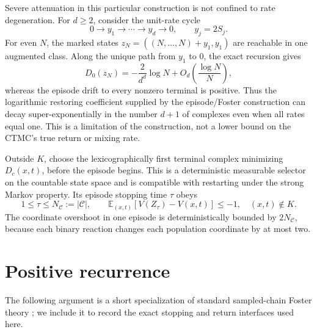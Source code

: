 \begin{remark}
Severe attenuation in this particular construction is not confined to rate
degeneration.  For \(d\ge2\), consider the unit-rate cycle
\[
  0\longrightarrow y_1\longrightarrow\cdots\longrightarrow y_d
  \longrightarrow0,
  \qquad y_j=2S_j.
\]
For even \(N\), the marked states
\(z_N=((N,\ldots,N)+y_1,y_1)\) are reachable in one augmented class.  Along
the unique path from \(y_1\) to \(0\), the exact recursion gives
\begin{equation}\label{eq:unit-rate-attenuation}
  D_0(z_N)=-\frac{2}{d^d}\log N
  +O_d\!\left(\frac{\log N}{N}\right),
\end{equation}
whereas the episode drift to every nonzero terminal is positive.  Thus the
logarithmic restoring coefficient supplied by the episode/Foster construction
can decay super-exponentially in the number \(d+1\) of complexes even when all
rates equal one.  This is a limitation of the construction, not a lower bound
on the CTMC's true return or mixing rate.
\end{remark}

Outside \(K\), choose the lexicographically first terminal complex minimizing
\(D_c(x,t)\), before the episode begins.  This is a deterministic measurable
selector on the countable state space and is compatible with restarting
under the strong Markov property.  Its episode stopping time \(\tau\) obeys
\begin{equation}\label{eq:episode-drift}
  1\le\tau\le N_{\mathcal C}:=|\mathcal C|,
  \qquad
  \mathbb E_{(x,t)}[V(Z_\tau)-V(x,t)]\le-1,
  \quad (x,t)\notin K.
\end{equation}
The coordinate overshoot in one episode is deterministically bounded by
\(2N_{\mathcal C}\), because each binary reaction changes each population coordinate by
at most two.

\section{Positive recurrence}\label{sec:recurrence}

The following argument is a short specialization of standard sampled-chain
Foster theory \citep{MeynTweedie2009}; we include it to record the exact
stopping and return interfaces used here.


